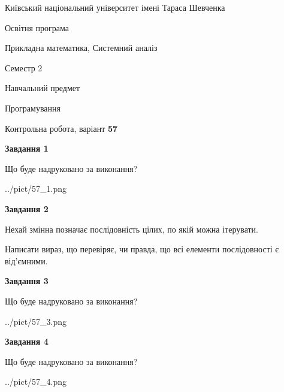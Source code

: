\documentclass[12pt, ukrainian]{article}
\begin{document}
{{\begin {small}\par
{ \center  Київський національний університет імені Тараса Шевченка \par}
{\parbox {5 cm}{Освітня програма \hfill}{\parbox {8 cm}{Прикладна математика, Системний аналіз \hfill}}\parbox {5 cm}{\hfill Семестр 2}}\par
{\parbox {5 cm} {Навчальний предмет \hfill}\parbox {7 cm}{Програмування \hfill}\parbox {6cm}{\hfill}\par}\vspace{-7pt} \end{small}}{\center Контрольна робота, варіант  \No \textbf
{ 57 }\par}}
{
\begin {large}
{\begin {center}\textbf{Завдання 1}\end {center}}\par
Що буде надруковано за виконання?\par\par
\begin{center}
	{../pict/57_1.png}
\end{center}
\newpage

{\begin {center}\textbf{Завдання 2}\end {center}}\par
Нехай змінна  позначає послідовність цілих, по якій можна ітерувати.

Написати вираз, що перевіряє, чи правда, що всі елементи послідовності є від’ємни\-ми.\par
\newpage

{\begin {center}\textbf{Завдання 3}\end {center}}\par
Що буде надруковано за виконання?\par
\begin{center}
	{../pict/57_3.png}
\end{center}
\newpage

{\begin {center}\textbf{Завдання 4}\end {center}}\par
Що буде надруковано за виконання?\par
\begin{center}
	{../pict/57_4.png}
\end{center}
\newpage


\end{large}}
\end{document}
